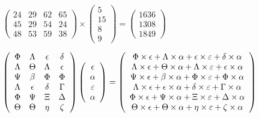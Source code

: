 \documentclass[12pt]{article}
\begin{document}
 

 
$\left( \begin{array}{ccccccccccccccc}
 24  & 
 29  & 
 62  & 
 65  \\ 
 45  & 
 29  & 
 54  & 
 24  \\ 
 48  & 
 53  & 
 59  & 
 38
\end{array}\right) \times
\left( \begin{array}{c}
 5  \\ 
 15  \\ 
 8  \\ 
 9
\end{array}\right)  =
\left( \begin{array}{c}
 1636  \\ 
 1308  \\ 
 1849
\end{array}\right)  $
 
$  %
 \left( \begin{array}
 {
 c
 c
 c
 c
 }
 \Phi & 
 \Lambda & 
 \epsilon & 
 \delta \\ 
 \Lambda & 
 \Theta & 
 \Lambda & 
 \epsilon \\ 
 \Psi & 
 \beta & 
 \Phi & 
 \Phi \\ 
 \Lambda & 
 \epsilon & 
 \delta & 
 \Gamma \\ 
 \Phi & 
 \Psi & 
                    \Xi & 
 \Delta \\ 
 \Theta & 
 \Theta & 
 \eta & 
                    \zeta
 \end{array} \right)
 \left( \begin{array}
 {
 c
 }
 \epsilon \\ 
 \alpha \\ 
 \varepsilon \\ 
 \alpha
 \end{array} \right)
=
  \left( \begin{array}
 {
 c
 }
 \Phi \times  \epsilon   +  \Lambda \times  \alpha   +  \epsilon \times  \varepsilon   +  \delta \times  \alpha \\ 
 \Lambda \times  \epsilon   +  \Theta \times  \alpha   +  \Lambda \times  \varepsilon   +  \epsilon \times  \alpha \\ 
 \Psi \times  \epsilon   +  \beta \times  \alpha   +  \Phi \times  \varepsilon   +  \Phi \times  \alpha \\ 
 \Lambda \times  \epsilon   +  \epsilon \times  \alpha   +  \delta \times  \varepsilon   +  \Gamma \times  \alpha \\ 
 \Phi \times  \epsilon   +  \Psi \times  \alpha   +                     \Xi \times  \varepsilon   +  \Delta \times  \alpha \\ 
 \Theta \times  \epsilon   +  \Theta \times  \alpha   +  \eta \times  \varepsilon   +                     \zeta \times  \alpha
 \end{array} \right)
$
 
\end{document}

